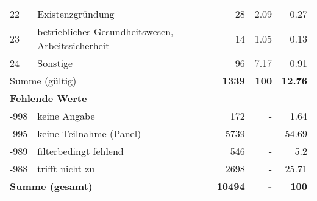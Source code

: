 \begin{longtable}{lXrrr}
        22 & \multicolumn{1}{X}{Existenzgründung} & %
          \num{28} &
          \num[round-mode=places,round-precision=2]{2,09} &
          \num[round-mode=places,round-precision=2]{0,27} \\

        23 & \multicolumn{1}{X}{betriebliches Gesundheitswesen, Arbeitssicherheit} & %
          \num{14} &
          \num[round-mode=places,round-precision=2]{1,05} &
          \num[round-mode=places,round-precision=2]{0,13} \\

        24 & \multicolumn{1}{X}{Sonstige} & %
          \num{96} &
          \num[round-mode=places,round-precision=2]{7,17} &
          \num[round-mode=places,round-precision=2]{0,91} \\

     \midrule
     \multicolumn{2}{l}{Summe (gültig)} &
       \textbf{\num{1339}} &
     \textbf{100} &
       \textbf{\num[round-mode=places,round-precision=2]{12,76}} \\
     \multicolumn{5}{l}{\textbf{Fehlende Werte}}\\
       -998 &
       keine Angabe &
         \num{172} &
        - &
         \num[round-mode=places,round-precision=2]{1,64} \\
       -995 &
       keine Teilnahme (Panel) &
         \num{5739} &
        - &
         \num[round-mode=places,round-precision=2]{54,69} \\
       -989 &
       filterbedingt fehlend &
         \num{546} &
        - &
         \num[round-mode=places,round-precision=2]{5,2} \\
       -988 &
       trifft nicht zu &
         \num{2698} &
        - &
         \num[round-mode=places,round-precision=2]{25,71} \\
     \midrule
     \multicolumn{2}{l}{\textbf{Summe (gesamt)}} &
          \textbf{\num{10494}} &
        \textbf{-} &
        \textbf{100} \\
     \bottomrule
     \end{longtable}
     
